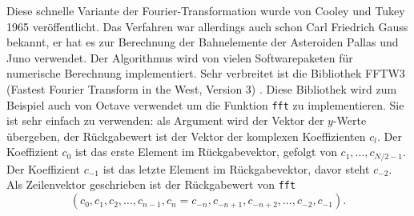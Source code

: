 Diese schnelle Variante der Fourier-Transformation wurde von Cooley 
und Tukey 1965 veröffentlicht.
Das Verfahren war allerdings auch schon Carl Friedrich Gauss bekannt,
er hat es zur Berechnung der Bahnelemente der Asteroiden Pallas und
Juno verwendet.
Der Algorithmus wird von vielen Softwarepaketen für numerische Berechnung
implementiert.
Sehr verbreitet ist die Bibliothek FFTW3 (Fastest Fourier Transform in the
West, Version 3) \cite{skript:fftw}. 
Diese Bibliothek wird zum Beispiel auch von Octave verwendet um die
Funktion \texttt{fft} zu implementieren.
Sie ist sehr einfach zu verwenden: als Argument wird der Vektor der
$y$-Werte übergeben, der Rückgabewert ist der Vektor der komplexen
Koeffizienten $c_l$.
Der Koeffizient $c_0$ ist das erste Element im Rückgabevektor, gefolgt
von $c_1,\dots,c_{N/2-1}$.
Der Koeffizient $c_{-1}$ ist das letzte Element im Rückgabevektor, davor
steht $c_{-2}$.
Als Zeilenvektor geschrieben ist der Rückgabewert von \texttt{fft}
\[
( c_0, c_1, c_2, \dots , c_{n-1}, c_n=c_{-n},
c_{-n+1},c_{-n+2},\dots, c_{-2},c_{-1}).
\]



